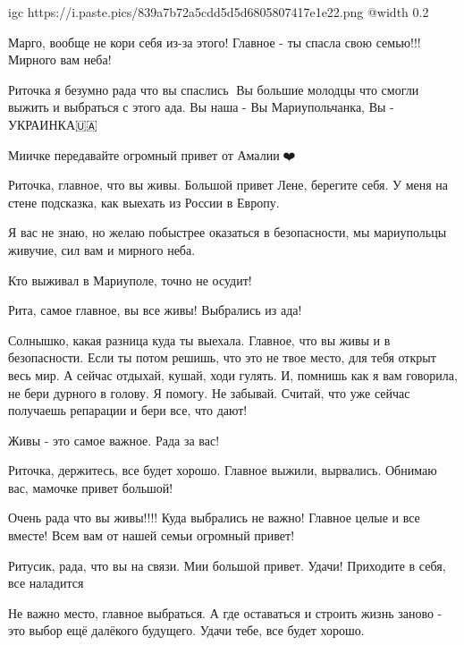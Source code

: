 \ifcmt
  igc https://i.paste.pics/839a7b72a5cdd5d5d6805807417e1e22.png
	@width 0.2
\fi


Марго, вообще не кори себя из-за этого! Главное - ты спасла свою семью!!! Мирного вам неба!


Риточка я безумно рада что вы спаслись🙏 Вы большие молодцы что смогли выжить и
выбраться с этого ада. Вы наша - Вы Мариупольчанка, Вы - УКРАИНКА🇺🇦


Миичке передавайте огромный привет от Амалии🤗❤️


Риточка, главное, что вы живы. Большой привет Лене, берегите себя. У меня на
стене подсказка, как выехать из России в Европу.


Я вас не знаю, но желаю побыстрее оказаться в безопасности, мы мариупольцы
живучие, сил вам и мирного неба.


Кто выживал в Мариуполе, точно не осудит!


Рита, самое главное, вы все живы! Выбрались из ада!


Солнышко, какая разница куда ты выехала. Главное, что вы живы и в безопасности.
Если ты потом решишь, что это не твое место, для тебя открыт весь мир. А сейчас
отдыхай, кушай, ходи гулять. И, помнишь как я вам говорила, не бери дурного в
голову. Я помогу. Не забывай. Считай, что уже сейчас получаешь репарации и бери
все, что дают!


Живы - это самое важное. Рада за вас!


Риточка, держитесь, все будет хорошо. Главное выжили, вырвались.
Обнимаю вас, мамочке привет большой! 💋


Очень рада что вы живы!!!! Куда выбрались не важно! Главное целые и все вместе!
Всем вам от нашей семьи огромный привет!


Ритусик, рада, что вы на связи. Мии большой привет. Удачи! Приходите в себя,
все наладится


Не важно место, главное выбраться. А где оставаться и строить жизнь заново -
это выбор ещё далёкого будущего. Удачи тебе, все будет хорошо.

